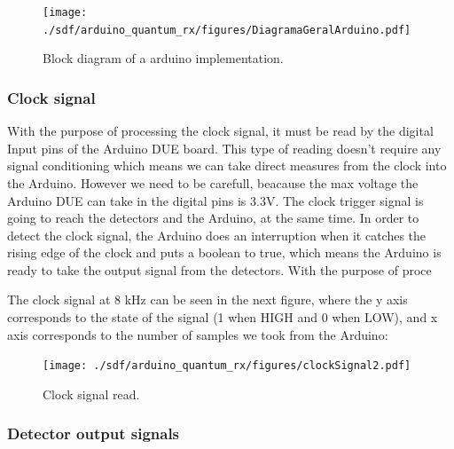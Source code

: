 \begin{refsection}
	\begin{figure}[H]
		\centering
		\texttt{[image: ./sdf/arduino\_quantum\_rx/figures/DiagramaGeralArduino.pdf]}
		\caption{Block diagram of a arduino implementation.}
		\label{fig:netxpto}	
	\end{figure}
	
	\vspace{15px}
	\subsubsection{Clock signal}
	
	With the purpose of processing the clock signal, it must be read by the digital Input pins of the Arduino DUE board. This type of reading doesn't require any signal conditioning which means we can take direct measures from the clock into the Arduino. However we need to be carefull, beacause the max voltage the Arduino DUE can take in the digital pins is 3.3V. The clock trigger signal is going to reach the detectors and the Arduino, at the same time. In order to detect the clock signal, the Arduino does an interruption when it catches the rising edge of the clock and puts a boolean to true, which means the Arduino is ready to take the output signal from the detectors.  With the purpose of proce
	
   \clearpage 
   The clock signal at 8 kHz can be seen in the next figure, where the y axis corresponds to the state of the signal (1 when HIGH and 0 when LOW), and x axis corresponds to the number of samples we took from the Arduino:
   
   
	
	\begin{figure}[H]
		\centering
		\texttt{[image: ./sdf/arduino\_quantum\_rx/figures/clockSignal2.pdf]}
		\caption{Clock signal read.}
		\label{montage}
	\end{figure}

\subsubsection{Detector output signals}


\end{refsection}

